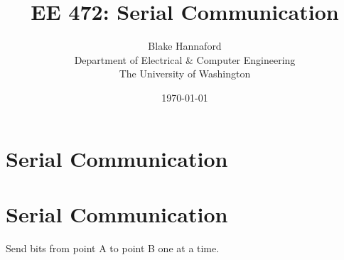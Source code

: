 %
%
%
%
%
%
%
%
\title{EE 472:  Serial Communication}

\author{Blake Hannaford\\
        Department of Electrical \& Computer Engineering \\
        The University of Washington
}

\date{\today}

%


\section*{\large\bf Serial Communication}	%
 

\maketitle

\section{Serial Communication}

Send bits from point A to point B one at a time.

